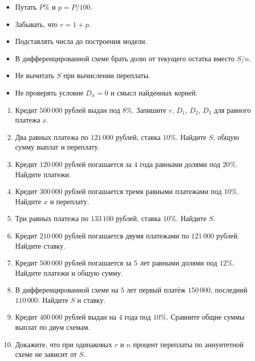 \documentclass[a4paper,12pt]{article}
\newcommand{\sectiontitle}[1]{\vspace{0.4em}{\Large\bfseries\textcolor{darkaccent}{#1}}\par\vspace{0.2em}{\color{accent}\rule{\linewidth}{0.7pt}}\par\vspace{0.45em}}
\begin{document}
\sectiontitle{8. Типичные ошибки}
\begin{itemize}[leftmargin=1.7em,itemsep=0.3em]
\item Путать $P\%$ и $p=P/100$.
\item Забывать, что $r=1+p$.
\item Подставлять числа до построения модели.
\item В дифференцированной схеме брать долю от текущего остатка вместо $S/n$.
\item Не вычитать $S$ при вычислении переплаты.
\item Не проверять условие $D_n=0$ и смысл найденных корней.
\end{itemize}

\clearpage
\sectiontitle{Тренировочный блок}
\begin{enumerate}[leftmargin=2em,itemsep=0.75em]
\item Кредит $500\,000$ рублей выдан под $8\%$. Запишите $r$, $D_1$, $D_2$, $D_3$ для равного платежа $x$.
\item Два равных платежа по $121\,000$ рублей, ставка $10\%$. Найдите $S$, общую сумму выплат и переплату.
\item Кредит $120\,000$ рублей погашается за $4$ года равными долями под $20\%$. Найдите платежи.
\item Кредит $300\,000$ рублей погашается тремя равными платежами под $10\%$. Найдите $x$ и переплату.
\item Три равных платежа по $133\,100$ рублей, ставка $10\%$. Найдите $S$.
\item Кредит $210\,000$ рублей погашается двумя платежами по $121\,000$ рублей. Найдите ставку.
\item Кредит $500\,000$ рублей погашается за $5$ лет равными долями под $12\%$. Найдите платежи и общую сумму.
\item В дифференцированной схеме на $5$ лет первый платёж $150\,000$, последний $110\,000$. Найдите $S$ и ставку.
\item Кредит $400\,000$ рублей выдан на $4$ года под $10\%$. Сравните общие суммы выплат по двум схемам.
\item Докажите, что при одинаковых $r$ и $n$ процент переплаты по аннуитетной схеме не зависит от $S$.
\end{enumerate}
\end{document}
